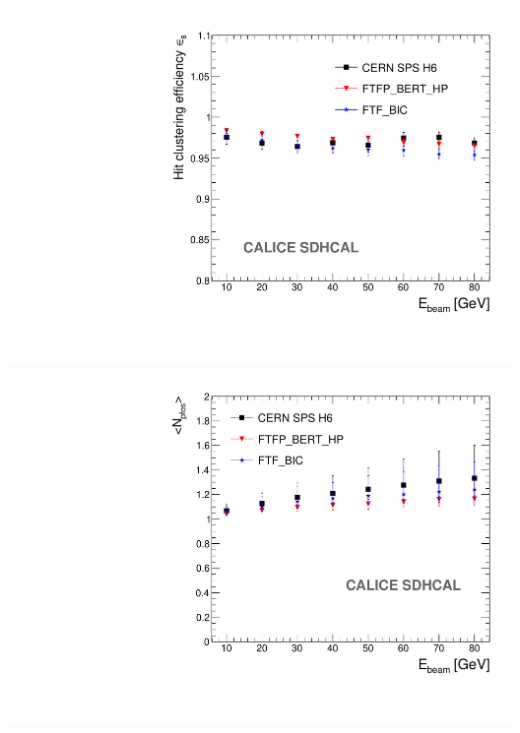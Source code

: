\documentclass[8pt]{beamer}
\begin{document}
\begin{frame}
\begin{minipage}{0.48\linewidth}
\begin{center}
        \includegraphics[width=0.8\linewidth]{Single_MC_DATA_COMP_Efficiency.pdf} \\
        \includegraphics[width=0.8\linewidth]{Single_MC_DATA_COMP_NPfos.pdf}
      \end{center}
    \end{minipage}
  \end{frame}
\end{document}
